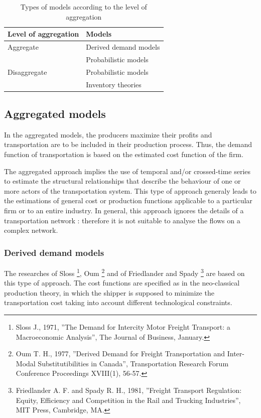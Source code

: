 \begin{table}
\begin{center}
\begin{tabular}{ll}
\hline
Level of aggregation  & Models\\
\hline
Aggregate &  Derived demand models\\

& Probabilistic models\\

Disaggregate & Probabilistic models\\

& Inventory theories\\
\hline
\end{tabular}
\caption{\label{tab2_6} Types of models according to the level of aggregation}
\end{center}
\end{table}





\subsection{Aggregated models}

In the aggregated models, the producers maximize their profits and
transportation are to be included in their production process.  Thus, the demand
function of transportation is based on the estimated cost function of the firm.

The aggregated approach implies the use of temporal and/or crossed-time series to
estimate the structural relationships that describe the behaviour of one or more
actors of the transportation system. This type of approach generaly leads to the estimations of general cost or production functions applicable to a particular
firm or to an entire industry.  In general, this approach ignores the details of
a transportation network : therefore it is not suitable to analyse the flows on
a complex network.




\subsubsection{Derived demand models}


The researches of Sloss \footnote{Sloss J., 1971, ''The Demand for Intercity
Motor Freight Transport: a Macroeconomic Analysis'', The Journal of Business,
January.}, Oum \footnote{Oum T. H., 1977, ''Derived Demand for Freight
Transportation and Inter-Modal Substitutibilities in Canada'', Transportation
Research Forum Conference Proceedings XVIII(1), 56-57.} and of Friedlander and
Spady \footnote{Friedlander A. F. and Spady R. H., 1981, ''Freight Transport
Regulation: Equity, Efficiency and Competition in the Rail and Trucking
Industries'', MIT Press, Cambridge, MA.} are based on this type of approach.
The cost functions are specified as in the neo-classical production theory, in which the shipper is supposed to minimize the transportation cost
taking into account different technological constraints.


